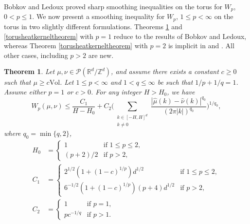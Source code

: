 \documentclass[11pt,a4paper]{article}
\newtheorem{thm}{Theorem}
\theoremstyle{definition}
\begin{document}
Bobkov and Ledoux \cite{BL1,BL2} proved sharp smoothing inequalities on the torus for $W_p$, $0<p \le 1$. We now present a smoothing inequality for $W_p$, $1 \le p < \infty$ on the torus in two slightly different formulations. Theorems \ref{torusjacksonkerneltheorem} and \ref{torusheatkerneltheorem} with $p=1$ reduce to the results of Bobkov and Ledoux, whereas Theorem \ref{torusheatkerneltheorem} with $p=2$ is implicit in \cite{BOR2} and \cite{BS}. All other cases, including $p>2$ are new.
\begin{thm}\label{torusjacksonkerneltheorem} Let $\mu, \nu \in \mathcal{P}(\mathbb{R}^d / \mathbb{Z}^d)$, and assume there exists a constant $c \ge 0$ such that $\mu \ge c \mathrm{Vol}$. Let $1 \le p < \infty$ and $1<q \le \infty$ be such that $1/p+1/q=1$. Assume either $p=1$ or $c>0$. For any integer $H>H_0$, we have
\[ W_p(\mu, \nu) \le \frac{C_1}{H-H_0} + C_2 \Bigg( \sum_{\substack{k \in [-H,H]^d \\ k \neq 0}} \frac{|\widehat{\mu}(k) - \widehat{\nu}(k)|^{q_0}}{(2 \pi |k|)^{q_0}} \Bigg)^{1/q_0} , \]
where $q_0=\min \{ q, 2 \}$,
\[ \begin{split} H_0 &= \left\{ \begin{array}{ll} 1 & \textrm{if } 1 \le p \le 2, \\ (p+2)/2 & \textrm{if } p>2, \end{array} \right. \\ C_1 &= \left\{ \begin{array}{ll} 2^{1/2}(1+(1-c)^{1/p})d^{1/2} & \textrm{if } 1 \le p \le 2, \\ 6^{-1/2} (1+(1-c)^{1/p}) (p+4) d^{1/2} & \textrm{if } p>2, \end{array} \right. \\ C_2 &=\left\{ \begin{array}{ll} 1 & \textrm{if } p=1, \\ p c^{-1/q} & \textrm{if } p>1. \end{array} \right. \end{split} \]
\end{thm}
\end{document}
